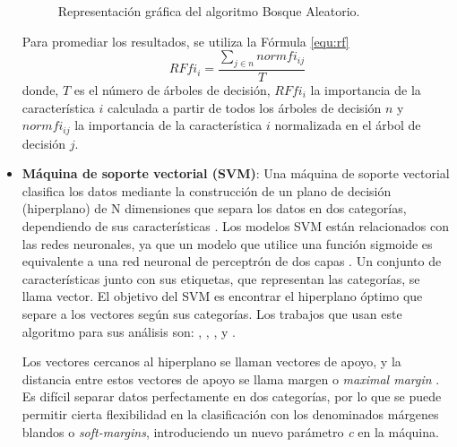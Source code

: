 \begin{itemize}
\begin{figure}[h!]
\begin{center}
{}
\end{center}
\caption{Representación gráfica del algoritmo Bosque Aleatorio.}
\label{fig:RF}
\end{figure}


Para promediar los resultados, se utiliza la Fórmula \ref{equ:rf} \cite{145}
\begin{equation}\label{equ:rf}
RFfi_i = \frac{\sum_{j \in n} normfi_{ij}}{T}
\end{equation}
\noindent donde, $T$ es el número de árboles de decisión, $RFfi_i$ la importancia de la característica $i$ calculada a partir de todos los árboles de decisión $n$ y $normfi_{ij}$ la importancia de la característica $i$ normalizada en el árbol de decisión $j$.


\item \textbf{Máquina de soporte vectorial (\gls{SVM})}:
Una máquina de soporte vectorial clasifica los datos mediante la construcción de un plano de decisión (hiperplano) de N dimensiones que separa los datos en dos categorías, dependiendo de sus características \cite{131}. Los modelos \gls{SVM} están relacionados con las redes neuronales, ya que un modelo que utilice una función sigmoide es equivalente a una red neuronal de perceptrón de dos capas \cite{128}. Un conjunto de características junto con sus etiquetas, que representan las categorías, se llama vector. El objetivo del \gls{SVM} es encontrar el hiperplano óptimo que separe a los vectores según sus categorías. Los trabajos que usan este algoritmo para sus análisis son: \cite{elderan}, \cite{flow}, \cite{shallow}, \cite{detecting} y \cite{entropy}.

Los vectores cercanos al hiperplano se llaman vectores de apoyo, y la distancia entre estos vectores de apoyo se llama margen o \textit{maximal margin} \cite{146}. Es difícil separar datos perfectamente en dos categorías, por lo que se puede permitir cierta flexibilidad en la clasificación con los denominados márgenes blandos o \textit{soft-margins}, introduciendo un nuevo parámetro \textit{c} en la máquina.


\end{itemize}
